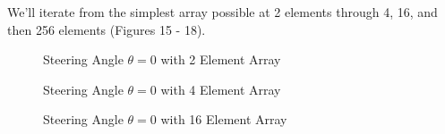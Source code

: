\documentclass[10pt,a4paper]{article}
\begin{document}
We'll iterate from the simplest array possible at 2 elements through 4, 16, and then 256 elements (Figures 15 - 18). 

\begin{figure}[!htb]
\caption{\label{fig:my-label} Steering Angle $\theta=0$ with 2 Element Array}
\end{figure}

\begin{figure}[!htb]
\caption{\label{fig:my-label} Steering Angle $\theta=0$ with 4 Element Array}
\end{figure}

\begin{figure}[!htb]
\caption{\label{fig:my-label} Steering Angle $\theta=0$ with 16 Element Array}
\end{figure}
\end{document}
